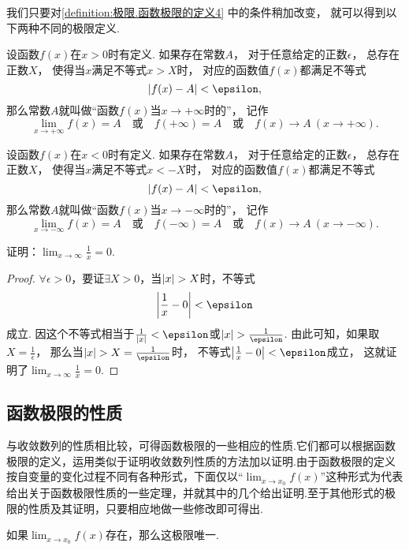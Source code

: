 我们只要对\cref{definition:极限.函数极限的定义4} 中的条件稍加改变，
就可以得到以下两种不同的极限定义.
\begin{definition}\label{definition:极限.函数极限的定义5}
设函数\(f(x)\)在\(x > 0\)时有定义.
如果存在常数\(A\)，
对于任意给定的正数\(\epsilon\)，
总存在正数\(X\)，
使得当\(x\)满足不等式\(x > X\)时，
对应的函数值\(f(x)\)都满足不等式\[
	\abs{f(x) - A} < \epsilon,
\]
那么常数\(A\)就叫做“函数\(f(x)\)当\(x \to +\infty\)时的”，
记作\[
	\lim_{x \to +\infty} f(x) = A
	\quad\text{或}\quad
	f(+\infty) = A
	\quad\text{或}\quad
	f(x) \to A\ (x \to +\infty).
\]
\end{definition}

\begin{definition}\label{definition:极限.函数极限的定义6}
设函数\(f(x)\)在\(x < 0\)时有定义.
如果存在常数\(A\)，
对于任意给定的正数\(\epsilon\)，
总存在正数\(X\)，
使得当\(x\)满足不等式\(x < -X\)时，
对应的函数值\(f(x)\)都满足不等式\[
\abs{f(x) - A} < \epsilon,
\]那么常数\(A\)就叫做“函数\(f(x)\)当\(x \to -\infty\)时的”，
记作\[
\lim_{x \to -\infty} f(x) = A
\quad\text{或}\quad
f(-\infty) = A
\quad\text{或}\quad
f(x) \to A\ (x \to -\infty).
\]
\end{definition}

\begin{example}
\def\l{\lim_{x\to\infty}}
证明：\(\l \frac{1}{x} = 0\).
\begin{proof}
\(\forall\epsilon>0\)，要证\(\exists X > 0\)，当\(\abs{x}>X\)时，不等式\[
\abs{\frac{1}{x}-0}<\epsilon
\]成立.
因这个不等式相当于\(\frac{1}{\abs{x}}<\epsilon\)或\(\abs{x}>\frac{1}{\epsilon}\).
由此可知，如果取\(X=\frac{1}{\epsilon}\)，
那么当\(\abs{x}>X=\frac{1}{\epsilon}\)时，
不等式\(\abs{\frac{1}{x}-0}<\epsilon\)成立，
这就证明了\(\l \frac{1}{x} = 0\).
\end{proof}
\end{example}

\subsection{函数极限的性质}
与收敛数列的性质相比较，可得函数极限的一些相应的性质.它们都可以根据函数极限的定义，运用类似于证明收敛数列性质的方法加以证明.由于函数极限的定义按自变量的变化过程不同有各种形式，下面仅以“\(\lim_{x \to x_0}f(x)\)”这种形式为代表给出关于函数极限性质的一些定理，并就其中的几个给出证明.至于其他形式的极限的性质及其证明，只要相应地做一些修改即可得出.

\begin{theorem}[函数极限的唯一性]\label{theorem:极限.函数极限的唯一性}
如果\(\lim_{x \to x_0}f(x)\)存在，那么这极限唯一.
\end{theorem}

